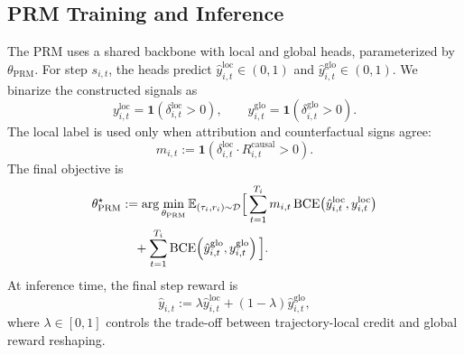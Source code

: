 \subsection{PRM Training and Inference}
\label{sec:method_prm}

The PRM uses a shared backbone with local and global heads,
parameterized by \(\theta_{\mathrm{PRM}}\).
For step \(s_{i,t}\), the heads predict
\(\hat y_{i,t}^{\mathrm{loc}}\in(0,1)\) and
\(\hat y_{i,t}^{\mathrm{glo}}\in(0,1)\).
We binarize the constructed signals as
\[
y_{i,t}^{\mathrm{loc}}=\mathbf{1}\!\left(\delta_{i,t}^{\mathrm{loc}}>0\right),
\qquad
y_{i,t}^{\mathrm{glo}}=\mathbf{1}\!\left(\delta_{i,t}^{\mathrm{glo}}>0\right).
\]
The local label is used only when attribution and counterfactual signs agree:
\begin{equation}
\label{eq:local_mask}
m_{i,t}
:=
\mathbf{1}\!\left(
\delta_{i,t}^{\mathrm{loc}} \cdot R_{i,t}^{\mathrm{causal}} > 0
\right).
\end{equation}
The final objective is
\begin{align}
\label{eq:stage3_objective}
\theta_{\mathrm{PRM}}^\star
&:=
\arg\min_{\theta_{\mathrm{PRM}}}
\mathbb{E}_{(\tau_i,r_i)\sim\mathcal{D}}
\Big[
\sum_{t=1}^{T_i}
m_{i,t}\,
\mathrm{BCE}\!\left(\hat y_{i,t}^{\mathrm{loc}}, y_{i,t}^{\mathrm{loc}}\right)
\notag\\
&\quad+
\sum_{t=1}^{T_i}
\mathrm{BCE}\!\left(\hat y_{i,t}^{\mathrm{glo}}, y_{i,t}^{\mathrm{glo}}\right)
\Big].
\end{align}
At inference time, the final step reward is
\[
\hat y_{i,t}
:=
\lambda \hat y_{i,t}^{\mathrm{loc}}
+
(1-\lambda)\hat y_{i,t}^{\mathrm{glo}},
\]
where \(\lambda\in[0,1]\) controls the trade-off between trajectory-local credit
and global reward reshaping.
